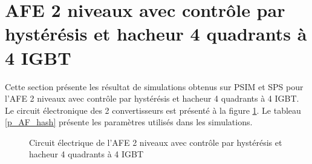 \section{AFE 2 niveaux avec contrôle par hystérésis et hacheur 4 quadrants à 4 IGBT}
Cette section présente les résultat de simulations obtenus sur PSIM et SPS pour l'AFE 2 niveaux avec contrôle par hystérésis et hacheur 4 quadrants à 4 IGBT. Le circuit électronique des 2 convertisseurs est présenté à la figure \ref{circuit_H4Q_AFE_2L_RC}. Le tableau \ref{p_AF_hash} présente les paramètres utilisés dans les simulations.

\begin{figure}[htb]
\caption{Circuit électrique de l'AFE 2 niveaux avec contrôle par hystérésis et hacheur 4 quadrants à 4 IGBT}
\label{circuit_H4Q_AFE_2L_RC}
\end{figure}


